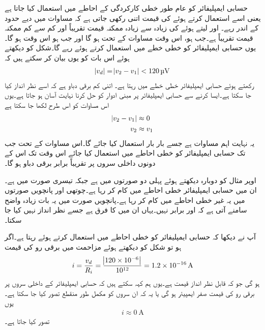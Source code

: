 
حسابی ایمپلیفائر کو عام طور خطی کارکردگی کے احاطے میں استعمال کیا جاتا ہے یعنی اسے  استعمال کرتے ہوئے   کی قیمت اتنی رکھی جاتی ہے کہ  مساوات  میں دیے حدود کے اندر رہے۔ اور  لیتے ہوئے  کی زیادہ سے زیادہ ممکنہ قیمت تقریباً اور کم سے کم ممکنہ قیمت تقریباً  ہے۔جب ہو،  اس وقت مساوات   کے تحت  ہو گا اور جب   ہو اس وقت ہو گا۔یوں حسابی ایمپلیفائر کو خطی خطے میں استعمال کرتے ہوئے  رہے گا۔شکل   کو دیکھتے ہوئے اس بات کو یوں بیان کر سکتے ہیں کہ
\begin{align}
\abs{v_d} =\abs{v_2-v_1} < \SI{120}{\micro \volt}
\end{align}
رکھتے ہوئے حسابی ایمپلیفائر خطی خطے میں رہتا ہے۔ اتنی کم برقی دباو ہے کہ اسے نظر انداز کیا جا سکتا ہے۔ایسا کرنے سے حسابی ایمپلیفائر پر مبنی ادوار کو حل کرنا نہایت آسان ہو جاتا ہے۔یوں  اس مساوات کو اس طرح لکھا جا سکتا ہے
\begin{gather}
\begin{aligned} \label{مساوات_حسابی_داخلی_سروں_پر_برابر_دباو}
\abs{v_2  -  v_1} &\approx 0   \\
v_2 & \approx v_1
\end{aligned}
\end{gather}
	یہ نہایت اہم مساوات ہے  جسے  بار بار استعمال کیا جائے گا۔اس مساوات کے تحت جب تک حسابی ایمپلیفائر کو خطی احاطے میں استعمال کیا جائے اس وقت تک اس کے دونوں داخلی سروں پر تقریباً برابر برقی دباو ہو گا۔

	اوپر مثال کو دوبارہ دیکھتے ہوئے پہلی دو صورتوں میں ہے جبکہ تیسری صورت میں  ہے۔ان میں حسابی ایمپلیفائر خطی احاطے میں کام کر رہا ہے۔چوتھی اور پانچویں صورتوں میں یہ غیر خطی احاطے میں کام کر رہا ہے۔پانچویں صورت میں یہ بات زیادہ واضح سامنے آتی ہے کہ  اور برابر نہیں۔یہاں ان میں   کا فرق ہے جسے نظر انداز نہیں کیا جا سکتا۔

	آپ نے دیکھا کہ حسابی ایمپلیفائر کو خطی احاطے میں استعمال کرتے ہوئے   رہتا ہے۔اگر ہو تو شکل   کو دیکھتے ہوئے مزاحمت میں برقی رو  کی قیمت
\begin{align}
i=\frac{v_d}{R_i} =\frac{\abs{120 \times 10^{-6}}}{10^{12}}=\SI{1.2e-16}{\ampere}
\end{align}
ہو گی جو کہ قابل نظر انداز قیمت ہے۔یوں ہم کہہ سکتے ہیں کہ حسابی ایمپلیفائر کے داخلی سروں پر برقی رو کی قیمت صفر ایمپیئر ہو گی یا یہ کہ ان سروں کو مکمل طور منقطع تصور کیا جا سکتا ہے۔یوں
\begin{align} \label{مساوات_حسابی_صفر_داخلی_رو}
{i \approx \SI{0}{\ampere}}
\end{align}
تصور کیا جاتا ہے۔

